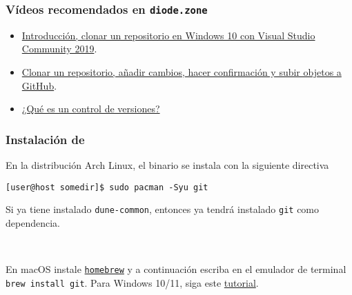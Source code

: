 



\begin{frame}
	\frametitle{Vídeos recomendados en \texttt{diode.zone}~\diode{}}
	\begin{itemize}
		\item[\diode{}]
		
		\href{https://diode.zone/w/fd7db693-38be-46fd-871d-dfb545953231}{Introducción, clonar un repositorio en Windows 10 con Visual Studio Community 2019}.
		
		\item[\diode{}]
		
		\href{https://diode.zone/w/6c6997e0-73d9-4346-b9d3-6643edf5942a}{Clonar un repositorio, añadir cambios, hacer confirmación y subir objetos a GitHub}.
		
		\item[\diode{}]
		
		\href{https://diode.zone/w/7nbonxgvEr7FMTgkKrEu4N}{¿Qué es un control de versiones?}
	\end{itemize}
\end{frame}

\begin{frame}[fragile]
	\frametitle{Instalación de~\git{}}

	En la distribución Arch Linux, el binario se instala con la
	siguiente directiva

	\begin{verbatim}
[user@host somedir]$ sudo pacman -Syu git
    \end{verbatim}

	Si ya tiene instalado \lstinline|dune-common|, entonces ya tendrá
	instalado \lstinline|git| como dependencia.

	\

	En macOS instale \href{https://brew.sh}{\lstinline|homebrew|} y a
	continuación escriba en el emulador de terminal
	\lstinline|brew install git|.
	Para Windows 10/11, siga este
	\href{https://courses-2020-1.gitlab.io/abet-project/guideofuser.pdf}{\alert{tutorial}}.
\end{frame}

